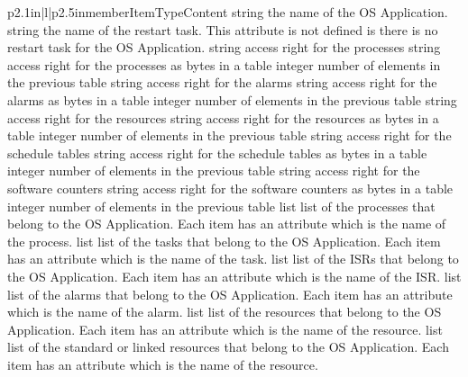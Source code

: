 \begin{longtableiii}{p{2.1in}|l|p{2.5in}}{member}{Item}{Type}{Content}
  {string}
  {the name of the OS Application.}
  {string}
  {the name of the restart task. This attribute is not defined is there is no restart task for the OS Application.}
  {string}
  {access right for the processes}
  {string}
  {access right for the processes as bytes in a table}
  {integer}
  {number of elements in the previous table}
  {string}
  {access right for the alarms}
  {string}
  {access right for the alarms as bytes in a table}
  {integer}
  {number of elements in the previous table}
  {string}
  {access right for the resources}
  {string}
  {access right for the resources as bytes in a table}
  {integer}
  {number of elements in the previous table}
  {string}
  {access right for the schedule tables}
  {string}
  {access right for the schedule tables as bytes in a table}
  {integer}
  {number of elements in the previous table}
  {string}
  {access right for the software counters}
  {string}
  {access right for the software counters as bytes in a table}
  {integer}
  {number of elements in the previous table}
  {list}
  {list of the processes that belong to the OS Application. Each item has an attribute  which is the name of the process.}
  {list}
  {list of the tasks that belong to the OS Application. Each item has an attribute  which is the name of the task.}
  {list}
  {list of the ISRs that belong to the OS Application. Each item has an attribute  which is the name of the ISR.}
  {list}
  {list of the alarms that belong to the OS Application. Each item has an attribute  which is the name of the alarm.}
  {list}
  {list of the resources that belong to the OS Application. Each item has an attribute  which is the name of the resource.}
  {list}
  {list of the standard or linked resources that belong to the OS Application. Each item has an attribute  which is the name of the resource.}

\end{longtableiii}
